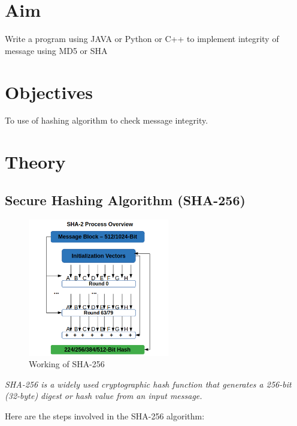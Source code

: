 \documentclass[11pt]{article}
\begin{document}
\tableofcontents
\thispagestyle{empty}
\clearpage

\setcounter{page}{1}

\section{Aim}
Write a program using JAVA or Python or C++ to implement integrity of message using
MD5 or SHA

\section{Objectives}
To use of hashing algorithm to check message integrity.

\section{Theory}

\subsection{Secure Hashing Algorithm (SHA-256)}

\begin{figure}[H]
    \centering
    \includegraphics[width=0.55\textwidth]{how-the-sha2-hashing-algorithm-works.png}
    \caption{Working of SHA-256}
\end{figure}

\textit{SHA-256 is a widely used cryptographic hash function that generates a 256-bit (32-byte) digest or hash value from an input message.}

Here are the steps involved in the SHA-256 algorithm:
\end{document}
